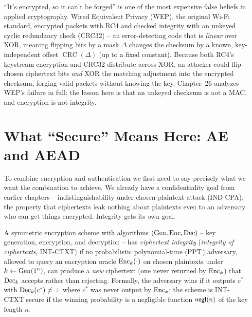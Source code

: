 \begin{trapbox}
``It's encrypted, so it can't be forged'' is one of the most expensive false beliefs in applied cryptography. Wired Equivalent Privacy (WEP), the original Wi-Fi standard, encrypted packets with RC4 and checked integrity with an unkeyed cyclic redundancy check (CRC32) -- an error-detecting code that is \emph{linear} over XOR, meaning flipping bits by a mask $\Delta$ changes the checksum by a known, key-independent offset $\operatorname{CRC}(\Delta)$ (up to a fixed constant). Because both RC4's keystream encryption and CRC32 distribute across XOR, an attacker could flip chosen ciphertext bits \emph{and} XOR the matching adjustment into the encrypted checksum, forging valid packets without knowing the key. Chapter~26 analyzes WEP's failure in full; the lesson here is that an unkeyed checksum is not a MAC, and encryption is not integrity.
\end{trapbox}

\section{What ``Secure'' Means Here: AE and AEAD}
\label{ch16:definitions}

To combine encryption and authentication we first need to say precisely what we want the combination to achieve. We already have a confidentiality goal from earlier chapters -- indistinguishability under chosen-plaintext attack (IND-CPA), the property that ciphertexts leak nothing about plaintexts even to an adversary who can get things encrypted. Integrity gets its own goal.

\begin{definition}
\label{ch16:int-ctxt}
A symmetric encryption scheme with algorithms $(\operatorname{Gen},\operatorname{Enc},\operatorname{Dec})$ -- key generation, encryption, and decryption -- has \emph{ciphertext integrity} (\emph{integrity of ciphertexts}, INT-CTXT) if no probabilistic polynomial-time ($\mathrm{PPT}$) adversary, allowed to query an encryption oracle $\operatorname{Enc}_k(\cdot)$ on chosen plaintexts under $k \gets \operatorname{Gen}(1^n)$, can produce a \emph{new} ciphertext (one never returned by $\operatorname{Enc}_k$) that $\operatorname{Dec}_k$ accepts rather than rejecting. Formally, the adversary wins if it outputs $c^{*}$ with $\operatorname{Dec}_k(c^{*}) \neq \bot$ where $c^{*}$ was never output by $\operatorname{Enc}_k$; the scheme is INT-CTXT secure if the winning probability is a negligible function $\mathsf{negl}(n)$ of the key length $n$.
\end{definition}

